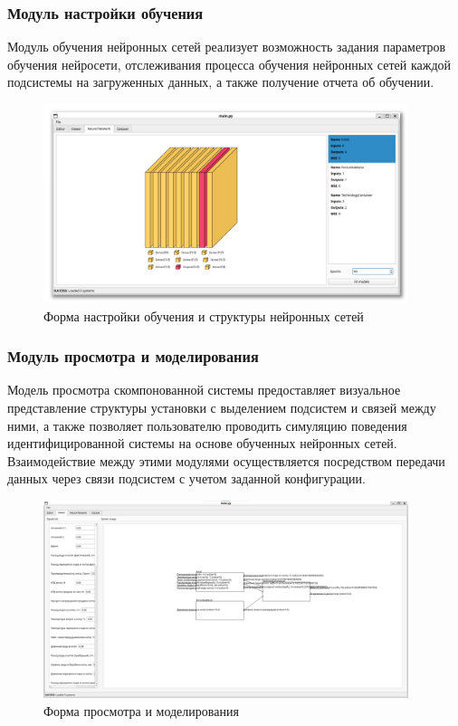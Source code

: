 \subsubsection{Модуль настройки обучения}

Модуль обучения нейронных сетей реализует возможность задания параметров
обучения нейросети, отслеживания процесса обучения нейронных сетей каждой
подсистемы на загруженных данных, а также получение отчета об обучении. 

\begin{figure}[H]
  \begin{center}
    \includegraphics[width=0.95\textwidth]{figures/modules/neural.png}
  \end{center}
  \caption{Форма настройки обучения и структуры нейронных
  сетей}\label{fig:forms:neural}
\end{figure}

\subsubsection{Модуль просмотра и моделирования}

Модель просмотра скомпонованной системы предоставляет визуальное представление
структуры установки с выделением подсистем и связей между ними, а также
позволяет пользователю проводить симуляцию поведения идентифицированной системы
на основе обученных нейронных сетей. Взаимодействие между этими модулями
осуществляется посредством передачи данных через связи подсистем с учетом
заданной конфигурации.

\begin{figure}[H]
  \begin{center}
    \includegraphics[width=0.95\textwidth]{figures/modules/modelling.png}
  \end{center}
  \caption{Форма просмотра и моделирования}\label{fig:forms:viewer}
\end{figure}

